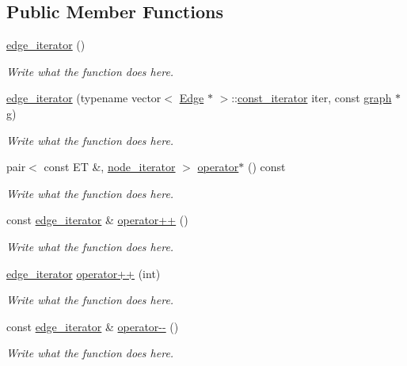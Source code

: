 \subsection*{Public Member Functions}
\begin{DoxyCompactItemize}
\item 
\hyperlink{classedge__iterator_abdf1319ec126ef6801f6cd62971c01d1}{edge\+\_\+iterator} ()
\begin{DoxyCompactList}\small\item\em Write what the function does here. \end{DoxyCompactList}\item 
\hyperlink{classedge__iterator_a82b48b4eb82843767a6cf518298d8a35}{edge\+\_\+iterator} (typename vector$<$ \hyperlink{structEdge}{Edge} $\ast$ $>$\+::\hyperlink{classconst__iterator}{const\+\_\+iterator} iter, const \hyperlink{classgraph}{graph} $\ast$g)
\begin{DoxyCompactList}\small\item\em Write what the function does here. \end{DoxyCompactList}\item 
pair$<$ const E\+T \&, \hyperlink{classnode__iterator}{node\+\_\+iterator} $>$ \hyperlink{classedge__iterator_aca8eafb503fba28b52791f6bc4f0c0c2}{operator$\ast$} () const 
\begin{DoxyCompactList}\small\item\em Write what the function does here. \end{DoxyCompactList}\item 
const \hyperlink{classedge__iterator}{edge\+\_\+iterator} \& \hyperlink{classedge__iterator_aba065d214c5845e9c71edbd46b662eb1}{operator++} ()
\begin{DoxyCompactList}\small\item\em Write what the function does here. \end{DoxyCompactList}\item 
\hyperlink{classedge__iterator}{edge\+\_\+iterator} \hyperlink{classedge__iterator_adb00a99ba9bfbcbc2ff305340e87ef07}{operator++} (int)
\begin{DoxyCompactList}\small\item\em Write what the function does here. \end{DoxyCompactList}\item 
const \hyperlink{classedge__iterator}{edge\+\_\+iterator} \& \hyperlink{classedge__iterator_a22358fcbf098ecb6e8de8781941e07a6}{operator-\/-\/} ()
\begin{DoxyCompactList}\small\item\em Write what the function does here. \end{DoxyCompactList}\item 

\end{DoxyCompactItemize}
